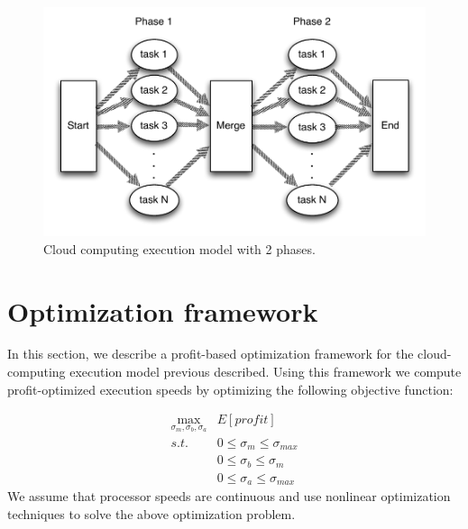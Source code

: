 \begin{figure}[!h]
	\begin{center}
		\includegraphics[width=0.6\columnwidth]{figures/system_model_1.pdf}
	\end{center}
	\caption{Cloud computing execution model with 2 phases.}
	\label{fig:system_model}
\end{figure} 

%

\section{Optimization framework}

In this section, we describe a profit-based optimization framework for
the cloud-computing execution model previous described. Using this
framework we compute profit-optimized execution speeds by
optimizing the following objective function:


\begin{equation}
\label{optimization_problem}
\begin{alignedat}{2}
\max_{\sigma_m,\sigma_b,\sigma_a}     & E[profit] \\
s.t.                                 & 0 \leq \sigma_m \leq \sigma_{max} \\
                                     & 0 \leq \sigma_b \leq \sigma_{m} \\
                                     & 0 \leq \sigma_a \leq \sigma_{max} 
\end{alignedat}
\end{equation}
We assume that processor
speeds are continuous and use nonlinear optimization techniques
to solve the above optimization problem. 

